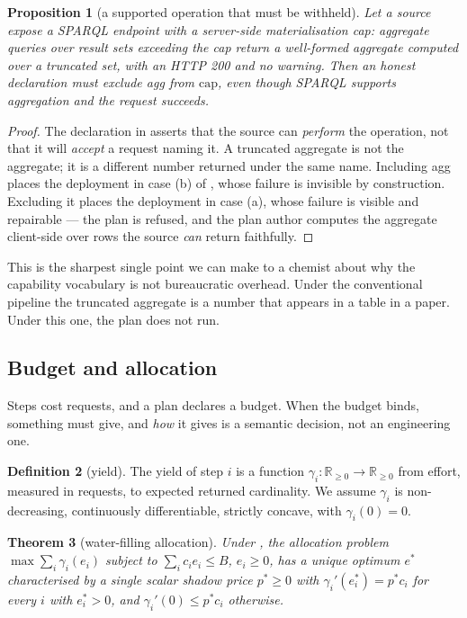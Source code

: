 \documentclass[11pt,a4paper]{article}
\theoremstyle{plain}
\newtheorem{theorem}{Theorem}[section]
\newtheorem{proposition}[theorem]{Proposition}
\theoremstyle{definition}
\newtheorem{definition}[theorem]{Definition}
\theoremstyle{remark}
\newcommand{\Capset}{\mathrm{cap}}
\newcommand{\Rset}{\mathbb{R}}
\newcommand{\Bud}{B}
\newcommand{\cost}{c}
\begin{document}
\begin{proposition}[a supported operation that must be withheld]
\label{prop:under}
Let a source expose a SPARQL endpoint with a server-side
materialisation cap: aggregate queries over result sets exceeding the
cap return a well-formed aggregate computed over a truncated set,
with an HTTP 200 and no warning. Then an honest declaration must exclude
\textsf{agg} from $\Capset$, even though SPARQL supports aggregation and
the request succeeds.
\end{proposition}

\begin{proof}
The declaration in  asserts that the source can
\emph{perform} the operation, not that it will \emph{accept} a request
naming it. A truncated aggregate is not the aggregate; it is a
different number returned under the same name. Including \textsf{agg}
places the deployment in case (b) of , whose failure
is invisible by construction. Excluding it places the deployment in case
(a), whose failure is visible and repairable --- the plan is refused,
and the plan author computes the aggregate client-side over rows the
source \emph{can} return faithfully.
\end{proof}

This is the sharpest single point we can make to a chemist about why
the capability vocabulary is not bureaucratic overhead. Under the
conventional pipeline the truncated aggregate is a number that appears
in a table in a paper. Under this one, the plan does not run.

\subsection{Budget and allocation}

Steps cost requests, and a plan declares a budget. When the budget binds,
something must give, and \emph{how} it gives is a semantic decision, not
an engineering one.

\begin{definition}[yield]
\label{def:yield}
The yield of step $i$ is a function $\gamma_i : \Rset_{\geq 0} \to
\Rset_{\geq 0}$ from effort, measured in requests, to expected returned
cardinality. We assume $\gamma_i$ is non-decreasing, continuously
differentiable, strictly concave, with $\gamma_i(0) = 0$.
\end{definition}

\begin{theorem}[water-filling allocation]
\label{thm:allocation}
Under , the allocation problem
$\max \sum_i \gamma_i(e_i)$ subject to $\sum_i \cost_i e_i \leq \Bud$,
$e_i \geq 0$, has a unique optimum $e^{\ast}$ characterised by a single
scalar shadow price $p^{\ast} \geq 0$ with
$\gamma_i'(e_i^{\ast}) = p^{\ast} \cost_i$ for every $i$ with
$e_i^{\ast} > 0$, and $\gamma_i'(0) \leq p^{\ast} \cost_i$ otherwise.
\end{theorem}
\end{document}
